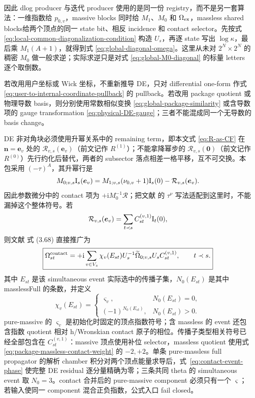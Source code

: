 \documentclass[11pt,a4paper]{ctexart}
\newcommand{\ii}{\mathrm i}
\newcommand{\cR}{\mathcal R}
\begin{document}
因此 dlog producer 与迭代 producer 使用的是同一份 registry，而不是另一套算法：一维指数给 $p_{0,v}$，massive blocks 同时给 $M_1$、$M_0$ 和 $\Omega_{\rm ex}$，massless shared blocks给两个顶点的同一 state bit、相反 incidence 和 contact selector。先按式 \eqref{eq:local-common-diagonalization-condition} 构造 $U_s$，再逐 state 写出 $\log\kappa$，最后乘 $M_1(A+1)$，就得到式 \eqref{eq:global-diagonal-omega}。这里从未对 $2^N\times2^N$ 的稠密 $M_0$ 做一般求逆；实际求逆只是对式 \eqref{eq:global-M0-diagonal} 的标量 letters 逐个取倒数。

若改用用户坐标或 Wick 坐标，不重新推导 DE，只对 differential one-form 作式 \eqref{eq:user-to-internal-coordinate-pullback} 的 pullback。若改用 package quotient 或物理导数 basis，则分别使用常数相似变换 \eqref{eq:global-package-similarity} 或含导数项的 gauge transformation \eqref{eq:physical-DE-gauge}；三者不能混成同一个无导数的 basis change。

DE 非对角块必须使用升幂关系中的 remaining term，即本文式 \eqref{eq:R-as-CF} 在 $\bm n=\bm e_v$ 处的 $\cR_{v,s}(\bm e_v)$（前文记作 $R^{(1)}$）；不能拿降幂步的 $\cR_{v,s}(\bm0)$（前文记作 $R^{(0)}$）先行约化后替代，两者的 subsector 落点相差一格平移，互不可交换。本包采用 $(-\tau)^A$，其升幂行是
\begin{equation}
 M_{0;v,s}\bm{\text I}_s(\bm e_v)
 =M_{1;v,s}(\nu_{0,v}+1)\bm{\text I}_s(0)-\cR_{v,s}(\bm e_v).
 \label{eq:package-raising-contact-sign}
\end{equation}
因此参数微分中的 contact 项为 $+\ii M_0^{-1}\cR$；把文献 \cite{Chen:2023eic} 的 $\tau^\nu$ 写法适配到这里时，不能漏掉这个整体符号。若
\begin{equation}
 \cR_{v,s}(\bm e_v)=\sum_{t\prec s}C_{st}^{(v,1)}\bm{\text I}_t(0),
\end{equation}
则文献 \cite{Chen:2023eic} 式 (3.68) 直接推广为
\begin{equation}
 \boxed{
 \Omega_{st}^{\rm contact}
 =+\ii\sum_{v\in V_s}\chi_v(E_{st})
 U_s^{-1}\widetilde\Omega_{0;v,s}U_s
 C_{st}^{(v,1)},
 \qquad t\prec s.
 }
 \label{eq:global-offdiagonal-omega}
\end{equation}
其中 $E_{st}$ 是该 simultaneous event 实际选中的传播子集，$N_0(E_{st})$ 是其中 masslessFull 的条数，并定义
\begin{equation}
 \chi_v(E_{st})=
 \begin{cases}
  \varsigma_v,&N_0(E_{st})=0,\\
  (-1)^{N_0(E_{st})},&N_0(E_{st})>0.
 \end{cases}
 \label{eq:contact-event-phase}
\end{equation}
pure-massive 的 $\varsigma_v$ 是初始化时固定的顶点指数符号；含 massless 的 event 还包含指数 quotient 相对 h/Wronskian contact 原子的相位。传播子类型相关符号已经全部包含在 $C_{st}^{(v,1)}$：massive 顶点使用补位 selector，massless quotient 使用式 \eqref{eq:package-massless-contact-weight} 的 $-2,+2$。单条 pure-massless full propagator 的解析 chamber 积分对两个顶点能量求导后，式~\eqref{eq:contact-event-phase} 使完整 DE residual 逐分量精确为零；三条共同 theta 的 simultaneous event 取 $N_0=3$。contact 合并后的 pure-massive component 必须只有一个 $\varsigma$；若输入使同一 component 混合正负指数，公式入口 fail closed。
\end{document}

